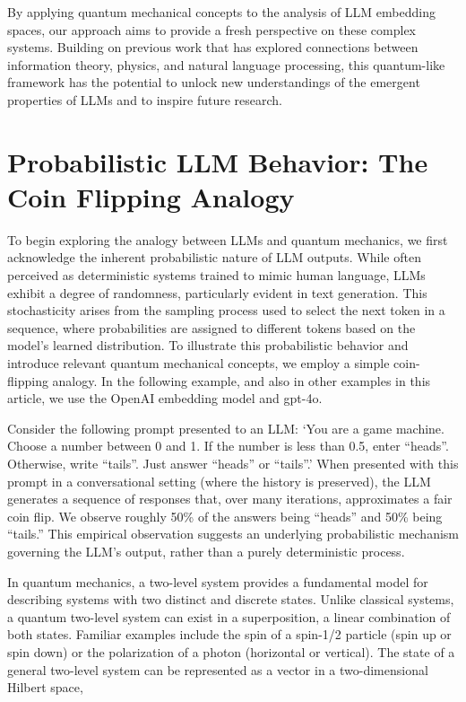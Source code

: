 \documentclass[prd,amsmath,amssymb,12pt]{revtex4}
\begin{document}
By applying quantum mechanical concepts to the analysis of LLM embedding spaces, our approach aims
to provide a fresh perspective on these complex systems. Building on previous work that has
explored connections between information theory, physics, and natural language processing,
this quantum-like framework has the potential to unlock new understandings of the emergent
properties of LLMs and to inspire future research.


\section{Probabilistic LLM Behavior: The Coin Flipping Analogy}

To begin exploring the analogy between LLMs and quantum mechanics, we first acknowledge the
inherent probabilistic nature of LLM outputs. While often perceived as deterministic systems trained
to mimic human language, LLMs exhibit a degree of randomness, particularly evident in text generation.
This stochasticity arises from the sampling process used to select the next token in a sequence, where
probabilities are assigned to different tokens based on the model's learned distribution. To illustrate
this probabilistic behavior and introduce relevant quantum mechanical concepts, we employ a simple coin-flipping analogy.
In the following example, and also in other examples in this article, we use the OpenAI embedding model and gpt-4o.

Consider the following prompt presented to an LLM: `You are a game machine. Choose a number between 0 and 1.
If the number is less than 0.5, enter ``heads''. Otherwise, write ``tails''. Just answer ``heads'' or ``tails''.'
When presented with this prompt in a conversational setting (where the history is preserved),
the LLM generates a sequence of responses that, over many iterations, approximates a fair coin flip.
We observe roughly 50\% of the answers being ``heads'' and 50\% being ``tails.'' This empirical observation
suggests an underlying probabilistic mechanism governing the LLM's output, rather than a purely deterministic process.

In quantum mechanics, a two-level system provides a fundamental model for describing systems with two distinct
and discrete states. Unlike classical systems, a quantum two-level system can exist in a superposition, a
linear combination of both states. Familiar examples include the spin of a spin-1/2 particle (spin up or
spin down) or the polarization of a photon (horizontal or vertical). The state of a general two-level
system can be represented as a vector in a two-dimensional Hilbert space,
\end{document}
